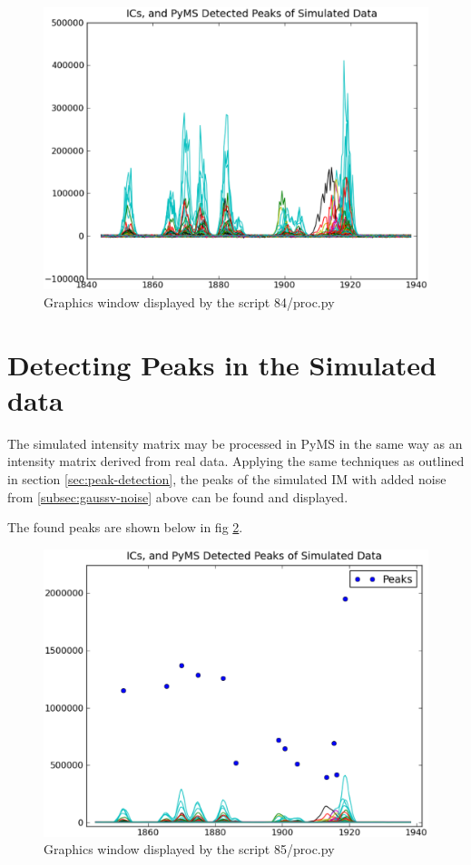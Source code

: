 \begin{figure}[h]
  \begin{center}
    \includegraphics[scale=0.25]{graphics/chapter10/test-84.eps}
  \end{center}
  \caption{Graphics window displayed by the script 84/proc.py}
  \label{fig:gaussv-noise}
\end{figure}

\section{Detecting Peaks in the Simulated data}


The simulated intensity matrix may be processed in PyMS in the same way as an intensity
matrix derived from real data. Applying the same techniques as outlined in section 
\ref{sec:peak-detection}, the peaks of the simulated IM with added noise from 
\ref{subsec:gaussv-noise} above can be found and displayed.

The found peaks are shown below in fig \ref{fig:sim-peaks}.

\begin{figure}[h]
  \begin{center}
    \includegraphics[scale=0.25]{graphics/chapter10/test-85.eps}
  \end{center}
  \caption{Graphics window displayed by the script 85/proc.py}
  \label{fig:sim-peaks}
\end{figure}